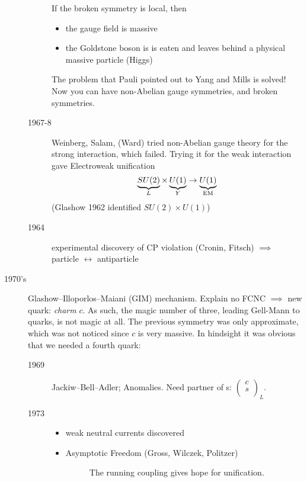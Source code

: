 \begin{description}
\begin{description}
      If the broken symmetry is local, then
      \begin{itemize}
	\item the gauge field is massive
	\item the Goldstone boson is is eaten and leaves behind a physical massive particle (Higgs)
      \end{itemize}

      The problem that Pauli pointed out to Yang and Mills is solved! Now you can have non-Abelian gauge symmetries, and broken symmetries.
    \item[1967-8] Weinberg, Salam, (Ward) tried non-Abelian gauge theory for the strong interaction, which failed. Trying it for the weak interaction gave Electroweak unification 
      \begin{equation}
	\underbrace{SU(2)}_{\mathclap{L}} \times \underbrace{U(1)}_{\mathclap{Y}} \to \underbrace{U(1)}_{\mathclap{\text{EM}}}
      \end{equation}
      (Glashow 1962 identified $SU(2) \times U(1)$)
    \item[1964] experimental discovery of CP violation (Cronin, Fitsch) $\implies$ particle $\leftrightarrow$ antiparticle
    \end{description}
  \item[1970's] Glashow--Illoporlos--Maiani (GIM) mechanism.
      Explain no FCNC $\implies$ new quark: \emph{charm} $c$.
      As such, the magic number of three, leading Gell-Mann to quarks, is not magic at all.
      The previous symmetry was only approximate, which was not noticed since $c$ is very massive.
      In hindsight it was obvious that we needed a fourth quark:
      \begin{description}
	\item[1969] Jackiw--Bell--Adler; Anomalies. Need partner of s: $ \begin{pmatrix} c \\ s \\ \end{pmatrix}_L $.
	\item[1973] 
	  \begin{itemize}
	    \item weak neutral currents discovered
	    \item Asymptotic Freedom (Gross, Wilczek, Politzer)
	      \begin{figure}[tbhp]
	        \centering
	        \def\svgwidth{0.5\columnwidth}
	        
	        \caption{The running coupling gives hope for unification.}

\end{figure}
\end{itemize}
\end{description}
\end{description}
